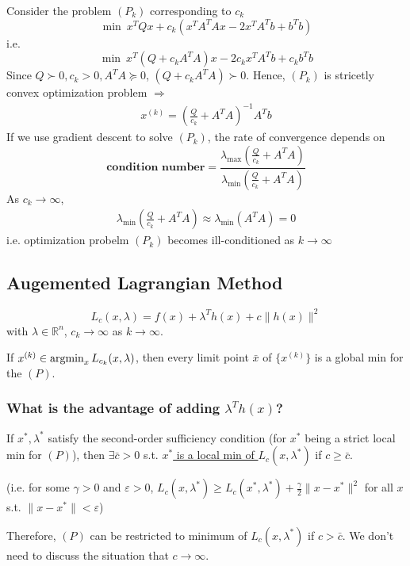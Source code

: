 \documentclass[11pt,a4paper]{article}
\newcommand{\argmin}{\operatornamewithlimits{argmin}}
\begin{document}
Consider the problem $(P_k)$ corresponding to $c_k$
$$\min\ x^TQx+c_k(x^TA^TAx-2x^TA^Tb+b^Tb)$$
i.e. $$\min\ x^T(Q+c_kA^TA)x-2c_kx^TA^Tb+c_kb^Tb$$
Since $Q\succ 0,c_k>0,A^TA\succeq 0$, $(Q+c_kA^TA)\succ 0$. Hence, $(P_k)$ is stricetly convex optimization problem $\Rightarrow$
\begin{equation}
    \begin{aligned}
        x^{(k)}=\left(\frac{Q}{c_k}+A^TA\right)^{-1}A^Tb
    \end{aligned}
    \nonumber
\end{equation}
If we use gradient descent to solve $(P_k)$, the rate of convergence depends on $$\textbf{condition number} =\frac{\lambda_{\max}\left(\frac{Q}{c_k}+A^TA\right)}{\lambda_{\min}\left(\frac{Q}{c_k}+A^TA\right)}$$
As $c_k \rightarrow \infty$,
\begin{equation}
    \begin{aligned}
        \lambda_{\min}\left(\frac{Q}{c_k}+A^TA\right)\approx \lambda_{\min}\left(A^TA\right)=0
    \end{aligned}
    \nonumber
\end{equation}
i.e. optimization probelm $(P_k)$ becomes ill-conditioned as $k \rightarrow	\infty$

\subsection{Augemented Lagrangian Method}
$$L_c(x,\lambda)=f(x)+\lambda^Th(x)+c\|h(x)\|^2$$
with $\lambda\in \mathbb{R}^n$, $c_k \rightarrow \infty$ as $k \rightarrow\infty$.

If $x^{(k)}\in \argmin_x L_{c_k}(x,\lambda)$, then every limit point $\bar{x}$ of $\{x^{(k)}\}$ is a global min for the $(P)$.

\subsubsection*{What is the advantage of adding $\lambda^Th(x)$?}
If $x^*,\lambda^*$ satisfy the second-order sufficiency condition (for $x^*$ being a strict local min for $(P)$), then $\exists \bar{c}>0$ s.t. \underline{$x^*$ is a local min of $L_c(x,\lambda^*)$} if $c\geq \bar{c}$.

(i.e. for some $\gamma>0$ and $\varepsilon>0$, $L_c(x,\lambda^*)\geq L_c(x^*,\lambda^*)+\frac{\gamma}{2}\|x-x^*\|^2$ for all $x$ s.t. $\|x-x^*\|<\varepsilon$)

Therefore, $(P)$ can be restricted to minimum of $L_c(x,\lambda^*)$ if $c>\bar{c}$. We don't need to discuss the situation that $c \rightarrow \infty$.
\end{document}
